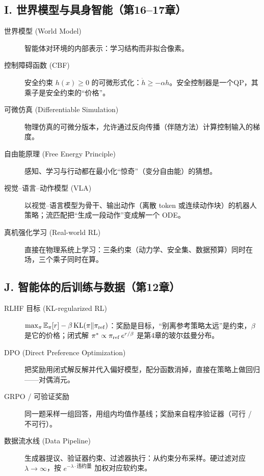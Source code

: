 \subsection*{I. 世界模型与具身智能（第16--17章）}

\begin{description}
    \item[世界模型 (World Model)]
    智能体对环境的内部表示：学习结构而非拟合像素。

    \item[控制障碍函数 (CBF)]
    安全约束 $h(x)\ge 0$ 的可微形式化：$\dot h \ge -\alpha h$。安全控制器是一个QP，其乘子是安全约束的“价格”。

    \item[可微仿真 (Differentiable Simulation)]
    物理仿真的可微分版本，允许通过反向传播（伴随方法）计算控制输入的梯度。

    \item[自由能原理 (Free Energy Principle)]
    感知、学习与行动都在最小化“惊奇”（变分自由能）的猜想。
\end{description}

    \begin{description}
    \item[视觉--语言--动作模型 (VLA)]
    以视觉--语言模型为骨干、输出动作（离散 token 或连续动作块）的机器人策略；流匹配把“生成一段动作”变成解一个 ODE。

    \item[真机强化学习 (Real-world RL)]
    直接在物理系统上学习：三条约束（动力学、安全集、数据预算）同时在场，三个乘子同时在算。
\end{description}

\subsection*{J. 智能体的后训练与数据（第12章）}

\begin{description}
    \item[RLHF 目标 (KL-regularized RL)]
    $\max_\pi \mathbb{E}_\pi[r] - \beta\,\mathrm{KL}(\pi\|\pi_{\rm ref})$：奖励是目标，“别离参考策略太远”是约束，$\beta$ 是它的价格；闭式解 $\pi^*\propto \pi_{\rm ref}\,e^{r/\beta}$ 是第4章的玻尔兹曼分布。

    \item[DPO (Direct Preference Optimization)]
    把奖励用闭式解反解并代入偏好模型，配分函数消掉，直接在策略上做回归——对偶消元。

    \item[GRPO / 可验证奖励]
    同一题采样一组回答，用组内均值作基线；奖励来自程序验证器（可行 / 不可行）。

    \item[数据流水线 (Data Pipeline)]
    生成器提议、验证器约束、过滤器执行：从约束分布采样。硬过滤对应 $\lambda\to\infty$，按 $e^{-\lambda\cdot\text{违约量}}$ 加权对应软约束。
\end{description}

